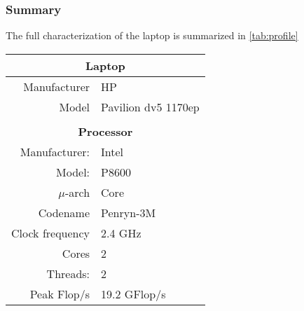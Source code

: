 \documentclass[twocolumn,10pt]{scrartcl}
\begin{document}
\subsubsection{Summary}
\label{ref:2.1.3}
The full characterization of the laptop is summarized in \autoref{tab:profile}

\begin{table}[!htp]
	\begin{center}
		\begin{tabular}{|rl|}
			\multicolumn{2}{c}{\textbf{Laptop}}				\\
			\hline
				Manufacturer		&	HP					\\
				Model				&	Pavilion dv5 1170ep	\\
			\hline
			\multicolumn{2}{c}{} 							\\
			\multicolumn{2}{c}{\textbf{Processor}} 			\\
			\hline
				Manufacturer:		&	Intel				\\
				Model:				&	P8600				\\
				$\mu$-arch			&	Core				\\
				Codename			&	Penryn-3M			\\
				Clock frequency		&	2.4 GHz				\\
				Cores				&	2					\\
				Threads:			&	2					\\
				Peak Flop/s			&	19.2 GFlop/s		\\
			\hline
		\end{tabular}
	\end{center}


\end{table}
\end{document}
